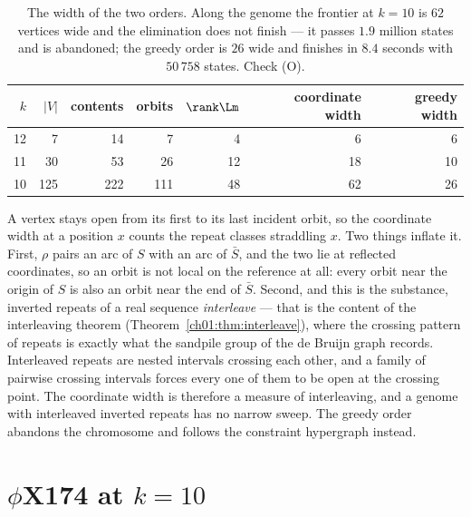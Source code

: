 \begin{table}[t]
\centering
\small
\begin{tabular}{rrrrrrr}
\toprule
$k$ & $|V|$ & contents & orbits & $\rank\Lm$ & coordinate width & greedy width\\
\midrule
12 &   7 &  14 &   7 &  4 &  6 &  6\\
11 &  30 &  53 &  26 & 12 & 18 & 10\\
10 & 125 & 222 & 111 & 48 & 62 & 26\\
\bottomrule
\end{tabular}
\caption{The width of the two orders. Along the genome the frontier at $k=10$ is $62$ vertices
wide and the elimination does not finish --- it passes $1.9$ million states and is abandoned;
the greedy order is $26$ wide and finishes in $8.4$ seconds with $50\,758$ states. Check (O).}
\label{ch08:tab:width}
\end{table}

\begin{remark}\label{ch08:rem:interleave}
A vertex stays open from its first to its last incident orbit, so the coordinate width at a
position $x$ counts the repeat classes straddling $x$. Two things inflate it. First,
$\rho$ pairs an arc of $S$ with an arc of $\bar S$, and the two lie at reflected coordinates,
so an orbit is not local on the reference at all: every orbit near the origin of $S$ is also an
orbit near the end of $\bar S$. Second, and this is the substance, inverted repeats of a real
sequence \emph{interleave} --- that is the content of the interleaving theorem (Theorem~\ref{ch01:thm:interleave}),
where the crossing pattern of repeats is exactly what the sandpile group of the de Bruijn graph
records. Interleaved repeats are nested intervals crossing each other, and a family of
pairwise crossing intervals forces every one of them to be open at the crossing point. The
coordinate width is therefore a measure of interleaving, and a genome with interleaved
inverted repeats has no narrow sweep. The greedy order abandons the chromosome and follows the
constraint hypergraph instead.
\end{remark}

\section{\texorpdfstring{$\phi$X174 at $k=10$}{phiX174 at k=10}}\label{ch08:sec:phix}

